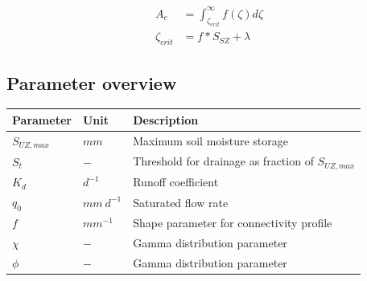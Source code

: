 \begin{align}
	A_c &= \int_{\zeta_{crit}}^{\infty}f(\zeta)d\zeta\\
	\zeta_{crit} &= f*S_{SZ} + \lambda
\end{align}

\newpage
\subsection{Parameter overview}
\begin{table}[htbp]
  \centering
    \begin{tabular}{lll}
    \toprule
    Parameter & Unit  & Description \\
    \midrule
    $S_{UZ,max}$ & $mm$  & Maximum soil moisture storage \\
    $S_t$ & $-$   & Threshold for drainage as fraction of $S_{UZ,max}$ \\
    $K_d$ & $d^{-1}$ & Runoff coefficient \\
    $q_0$ & $mm~d^{-1}$ & Saturated flow rate \\
    $f$   & $mm^{-1}$ & Shape parameter for connectivity profile \\
    $\chi$ & $-$   & Gamma distribution parameter \\
    $\phi$ & $-$   & Gamma distribution parameter \\
    \bottomrule
    \end{tabular}%
  \label{tab:addlabel}%
\end{table}%

